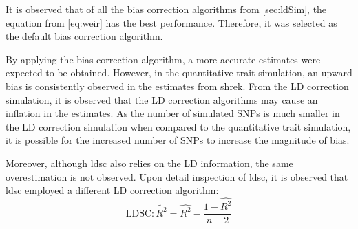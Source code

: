 	It is observed that of all the bias correction algorithms from \cref{sec:ldSim}, the  equation from \citet{Weir1980} \cref{eq:weir} has the best performance. 
	Therefore, it was selected as the default bias correction algorithm.
	
	By applying the bias correction algorithm, a more accurate estimates were expected to be obtained.
	However, in the quantitative trait simulation, an upward bias is consistently observed in the estimates from \gls{shrek}.
	From the \gls{LD} correction simulation, it is observed that the \gls{LD} correction algorithms may cause an inflation in the estimates.
	As the number of simulated \glspl{SNP} is much smaller in the \gls{LD} correction simulation when compared to the quantitative trait simulation, it is possible for the increased number of \glspl{SNP} to increase the magnitude of bias.
	
	Moreover, although \gls{ldsc} also relies on the \gls{LD} information, the same overestimation is not observed.
	Upon detail inspection of \gls{ldsc}, it is observed that \gls{ldsc} employed a different \gls{LD} correction algorithm:
	\begin{equation}
	\text{LDSC}: \tilde{R^2}= \hat{R^2}-\frac{1-\hat{R^2}}{n-2}\label{eq:ldscR2} 
	\end{equation}
	

